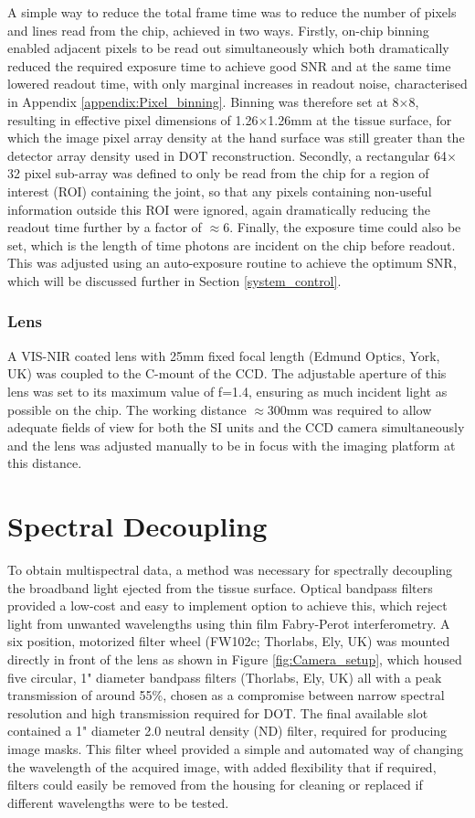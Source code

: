 \documentclass[twoside]{bhamthesis}
\theoremstyle{definition}
\begin{document}
A simple way to reduce the total frame time was to reduce the number of pixels and lines read from the chip, achieved in two ways. Firstly, on-chip binning enabled adjacent pixels to be read out simultaneously which both dramatically reduced the required exposure time to achieve good SNR and at the same time lowered readout time, with only marginal increases in readout noise, characterised in Appendix \ref{appendix:Pixel_binning}. Binning was therefore set at 8$\times$8, resulting in effective pixel dimensions of 1.26$\times$1.26mm at the tissue surface, for which the image pixel array density at the hand surface was still greater than the detector array density used in DOT reconstruction. Secondly, a rectangular 64$\times$32 pixel sub-array was defined to only be read from the chip for a region of interest (ROI) containing the joint, so that any pixels containing non-useful information outside this ROI were ignored, again dramatically reducing the readout time further by a factor of $\approx$6. Finally, the exposure time could also be set, which is the length of time photons are incident on the chip before readout. This was adjusted using an auto-exposure routine to achieve the optimum SNR, which will be discussed further in Section \ref{system_control}.

\subsubsection{Lens}

A VIS-NIR coated lens with 25mm fixed focal length (Edmund Optics, York, UK) was coupled to the C-mount of the CCD. The adjustable aperture of this lens was set to its maximum value of f=1.4, ensuring as much incident light as possible on the chip. The working distance $\approx$300mm was required to allow adequate fields of view for both the SI units and the CCD camera simultaneously and the lens was adjusted manually to be in focus with the imaging platform at this distance.

\section{Spectral Decoupling}

To obtain multispectral data, a method was necessary for spectrally decoupling the broadband light ejected from the tissue surface. Optical bandpass filters provided a low-cost and easy to implement option to achieve this, which reject light from unwanted wavelengths using thin film Fabry-Perot interferometry. A six position, motorized filter wheel (FW102c; Thorlabs, Ely, UK) was mounted directly in front of the lens as shown in Figure \ref{fig:Camera_setup}, which housed five circular, 1" diameter bandpass filters (Thorlabs, Ely, UK) all with a peak transmission of around 55\%, chosen as a compromise between narrow spectral resolution and high transmission required for DOT. The final available slot contained a 1" diameter 2.0 neutral density (ND) filter, required for producing image masks. This filter wheel provided a simple and automated way of changing the wavelength of the acquired image, with added flexibility that if required, filters could easily be removed from the housing for cleaning or replaced if different wavelengths were to be tested.
\end{document}

